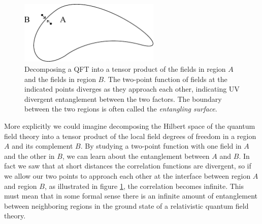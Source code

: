\documentclass[12pt]{article}
\begin{document}
\begin{figure}
\begin{center}
\includegraphics[height=3cm]{entangledcorr.pdf}
\caption{Decomposing a QFT into a tensor product of the fields in region $A$ and the fields in region $B$.  The two-point function of fields at the indicated points diverges as they approach each other, indicating UV divergent entanglement between the two factors.  The boundary between the two regions is often called the \textit{entangling surface}.}\label{entangledcorr}
\end{center}
\end{figure}
More explicitly we could imagine decomposing the Hilbert space of the quantum field theory into a tensor product of the local field degrees of freedom in a region $A$ and its complement $B$.  By studying a two-point function with one field in $A$ and the other in $B$, we can learn about the entanglement between $A$ and $B$.  In fact we saw that at short distances the correlation functions are divergent, so if we allow our two points to approach each other at the interface between region $A$ and region $B$, as illustrated in figure \ref{entangledcorr}, the correlation becomes infinite.  This must mean that in some formal sense there is an infinite amount of entanglement between neighboring regions in the ground state of a relativistic quantum field theory.
\end{document}
